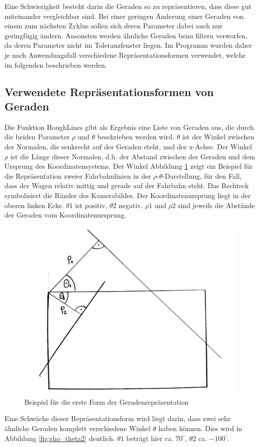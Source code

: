 	Eine Schwierigkeit besteht darin die Geraden so zu repräsentieren, dass diese gut miteinander vergleichbar sind. Bei einer geringen Änderung einer Geraden von einem zum nächsten Zyklus sollen sich deren Parameter dabei auch nur geringfügig ändern. Ansonsten werden ähnliche Geraden beim filtern verworfen, da deren Parameter nicht im Toleranzfenster liegen. Im Programm wurden daher je nach Anwendungsfall verschiedene Repräsentationsformen verwendet, welche im folgenden beschrieben werden.
	
	\subsection{Verwendete Repräsentationsformen von Geraden}
	
	Die Funktion HoughLines gibt als Ergebnis eine Liste von Geraden aus, die durch die beiden Parameter $\rho$ und $\theta$ beschrieben werden wird. $\theta$ ist der Winkel zwischen der Normalen, die senkrecht auf der Geraden steht, und der x-Achse. Der Winkel  $\rho$ ist die Länge dieser Normalen, d.h. der Abstand zwischen der Geraden und dem Ursprung des Koordinatensystems. Der Winkel 
	Abbildung \ref{fig:rho_theta1} zeigt ein Beispiel für die Repräsentation zweier Fahrbahnlinien in der $\rho$-$\theta$-Darstellung, für den Fall, dass der Wagen relativ mittig und gerade auf der Fahrbahn steht. Das Rechteck symbolisiert die Ränder des Kamerabildes. Der Koordinatenursprung liegt in der oberen linken Ecke. $\theta1$ ist positiv, $\theta2$ negativ. $\rho1$ und $\rho2$ sind jeweils die Abstände der Geraden vom Koordinatenursprung.
	
	\begin{figure}[H]
		\centering
		\includegraphics[width=.5\linewidth]{images/rho_theta1.jpg}
		\caption{Beispiel für die erste Form der Geradenrepräsentation}
		\label{fig:rho_theta1}
	\end{figure}
	
	Eine Schwäche dieser Repräsentationsform wird liegt darin, dass zwei sehr ähnliche Geraden komplett verschiedene Winkel $\theta$ haben können. Dies wird in Abbildung \ref{fig:rho_theta2} deutlich. $\theta1$ beträgt hier ca. $70^\circ$, $\theta2$ ca. $-100^\circ$.
	

